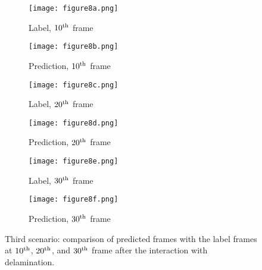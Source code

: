 \begin{figure} []
	\centering
	\begin{subfigure}[b]{0.44\textwidth}
		\centering
		\texttt{[image: figure8a.png]}
		\caption{Label, $10\textsuperscript{th}$ frame}
		\label{fig:num_462_label1}
	\end{subfigure}
	\hfill
	\begin{subfigure}[b]{0.44\textwidth}
		\centering
		\texttt{[image: figure8b.png]} 
		\caption{Prediction, $10\textsuperscript{th}$ frame}
		\label{fig:num_462_pred1}
	\end{subfigure}
	\hfill
	\begin{subfigure}[b]{0.44\textwidth}
		\centering
		\texttt{[image: figure8c.png]}
		\caption{Label, $20\textsuperscript{th}$ frame}
		\label{fig:num_462_label2}
	\end{subfigure}
	\hfill
	\begin{subfigure}[b]{0.44\textwidth}
		\centering
		\texttt{[image: figure8d.png]}
		\caption{Prediction, $20\textsuperscript{th}$ frame}
		\label{fig:num_462_pred2}
	\end{subfigure}
	\hfill
	\begin{subfigure}[b]{0.44\textwidth}
		\centering
		\texttt{[image: figure8e.png]}
		\caption{Label, $30\textsuperscript{th}$ frame}
		\label{fig:num_462_label3}
	\end{subfigure}
	\hfill	
	\begin{subfigure}[b]{0.44\textwidth}
		\centering
		\texttt{[image: figure8f.png]}
		\caption{Prediction, $30\textsuperscript{th}$ frame }
		\label{fig:num_462_pred3}
	\end{subfigure}
	\hfill	
	\caption{Third scenario: comparison of predicted frames with the label 
		frames at $10\textsuperscript{th}$, $20\textsuperscript{th}$, and 
		$30\textsuperscript{th}$ frame after the interaction with delamination.}
	\label{fig:num_462}
\end{figure}
\clearpage

